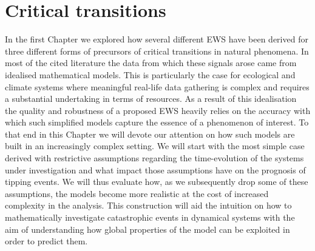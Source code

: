 \documentclass[../main.tex]{subfiles}
\begin{document}
\section{Critical transitions}\label{sec3}
In the first Chapter we explored how several different EWS have been derived for three different forms of precursors of critical transitions in natural phenomena.
In most of the cited literature the data from which these signals arose came from idealised mathematical models.
This is particularly the case for ecological and climate systems where meaningful real-life data gathering is complex and requires a substantial undertaking in terms of resources.
As a result of this idealisation the quality and robustness of a proposed EWS heavily relies on the accuracy with which such simplified models capture the essence of a phenomenon of interest.
To that end in this Chapter we will devote our attention on how such models are built in an increasingly complex setting.
We will start with the most simple case derived with restrictive assumptions regarding the time-evolution of the systems under investigation and what impact those assumptions have on the prognosis of tipping events.
We will thus evaluate how, as we subsequently drop some of these assumptions, the models become more realistic at the cost of increased complexity in the analysis.
This construction will aid the intuition on how to mathematically investigate catastrophic events in dynamical systems with the aim of understanding how global properties of the model can be exploited in order to predict them.



\end{document}
